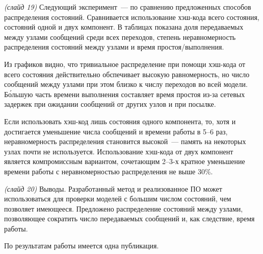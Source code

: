 \documentclass[a4paper,12pt,notitlepage]{article}
\begin{document}

\emph{(слайд 19)} Следующий эксперимент~--- по сравнению предложенных способов
распределения состояний. Сравнивается использование хэш-кода всего состояния, состояний
одной и двух компонент. В таблицах показана доля передаваемых между узлами сообщений среди
всех переходов, степень неравномерность распределения состояний между узлами и время
простоя/выполнения.

Из графиков видно, что тривиальное распределение при помощи хэш-кода от всего состояния
действительно обспечивает высокую равномерность, но число сообщений между узлами при этом
близко к числу переходов во всей модели. Б\'{о}льшую часть времени выполнения составляет
время простоя из-за сетевых задержек при ожидании сообщений от других узлов и при посылке.

Если использовать хэш-код лишь состояния одного компонента, то, хотя и достигается
уменьшение числа сообщений и времени работы в 5--6 раз, неравномерность распределения
становится высокой~--- память на некоторых узлах почти не используется. Использование
хэш-кода от двух компонент является компромиссным вариантом, сочетающим 2--3-х кратное
уменьшение времени работы с неравномерностью распределения не выше 30\%.

\emph{(слайд 20)} Выводы. Разработанный метод и реализованное ПО может использоваться для
проверки моделей с большим числом состояний, чем позволяет имеющееся. Предложено
распределение состояний между узлами, позволяющее сократить число передаваемых сообщений
и, как следствие, время работы.

По результатам работы имеется одна публикация.
\end{document}
